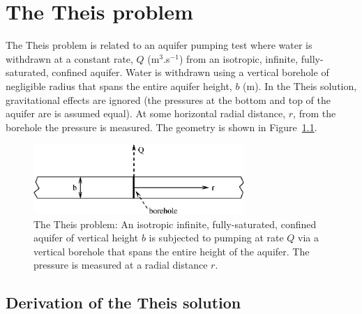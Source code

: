 \documentclass[]{scrreprt}
\begin{document}
\chapter{The Theis problem}
\label{th}

The Theis problem is related to an aquifer pumping test where water is
withdrawn at a constant rate, $Q$ (m$^{3}$.s$^{-1}$) from an
isotropic, infinite, fully-saturated, confined aquifer.  Water is withdrawn
using a vertical borehole of negligible radius that spans the entire
aquifer height, $b$ (m).  In the Theis solution, gravitational
effects are ignored (the pressures at the bottom and top of the
aquifer are is assumed equal).  At some horizontal radial distance, $r$, from
the borehole the pressure is measured.  The geometry is shown in
Figure~\ref{th.setup.fig}. 

\begin{figure}[htb]
\begin{center}
\includegraphics[width=8cm]{th.setup.eps}
\caption{The Theis problem: An isotropic infinite, fully-saturated,
  confined aquifer of vertical height $b$ is subjected to pumping at
  rate $Q$ via a vertical borehole that spans the entire height of the
  aquifer.  The pressure is measured at a radial distance $r$.}
\label{th.setup.fig}
\end{center}
\end{figure}

\section{Derivation of the Theis solution}
\end{document}
